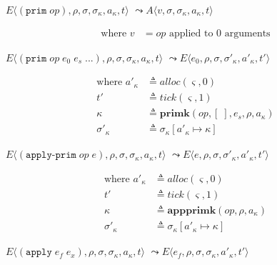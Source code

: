 \documentclass[12pt,draft]{article}
\newcommand{\primsyn}[2]{(\texttt{prim}\;#1\;#2\;...)}
\newcommand{\singleprimsyn}[1]{(\texttt{prim}\;#1)}
\newcommand{\applyprimsyn}[2]{(\texttt{apply-prim}\;#1\;#2)}
\newcommand{\applysyn}[2]{(\texttt{apply}\;#1\;#2)}
\begin{document}
{\begin{multicols*}{2}
\begin{center}
  $E\langle \singleprimsyn{op} , \rho , \sigma , \sigma_\kappa , a_\kappa , t \rangle$
  $\leadsto A\langle v , \sigma , \sigma_\kappa , a_\kappa , t \rangle$
\end{center}
\vspace{-7mm}
\begin{align*}
\text{where } v &= op \text{ applied to } 0 \text{ arguments}
\end{align*}
\begin{center}
  $E\langle \primsyn{op}{e_0\;e_s} , \rho , \sigma , \sigma_\kappa , a_\kappa , t \rangle$
  $\leadsto E\langle e_0 , \rho , \sigma , \sigma'_\kappa , a'_\kappa , t' \rangle$
\end{center}
\vspace{-7mm}
\begin{align*}
  \text{where }
  a'_\kappa &\triangleq alloc(\varsigma, 0) \\
  t' &\triangleq tick(\varsigma, 1) \\
  \kappa &\triangleq \textbf{primk}(op, [\;], e_s, \rho, a_\kappa) \\
  \sigma'_\kappa &\triangleq \sigma_\kappa[a'_\kappa \mapsto \kappa]
\end{align*}
\begin{center}
  $E\langle \applyprimsyn{op}{e} , \rho , \sigma , \sigma_\kappa , a_\kappa , t \rangle$
  $\leadsto E\langle e , \rho , \sigma , \sigma'_\kappa , a'_\kappa , t' \rangle$
\end{center}
\vspace{-7mm}
\begin{align*}
  \text{where }
  a'_\kappa &\triangleq alloc(\varsigma, 0) \\
  t' &\triangleq tick(\varsigma, 1) \\
  \kappa &\triangleq \textbf{appprimk}(op, \rho, a_\kappa) \\
  \sigma'_\kappa &\triangleq \sigma_\kappa[a'_\kappa \mapsto \kappa]
\end{align*}
\begin{center}
  $E\langle \applysyn{e_f}{e_x} , \rho , \sigma , \sigma_\kappa , a_\kappa , t \rangle$
  $\leadsto E\langle e_f , \rho , \sigma , \sigma_\kappa , a'_\kappa , t' \rangle$
\end{center}

\end{multicols*}}
\end{document}
